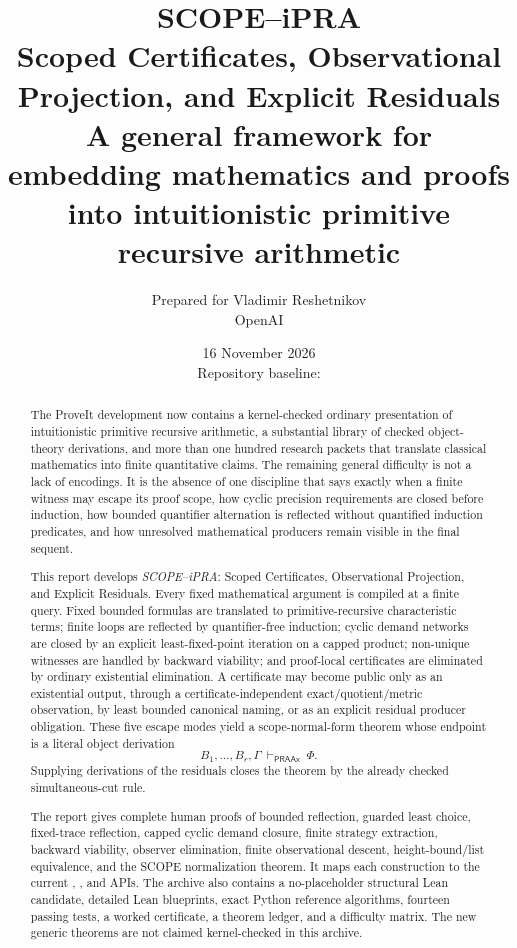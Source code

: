 \documentclass[11pt,oneside]{article}
\title{\textbf{SCOPE--iPRA}\\[2mm]
\Large Scoped Certificates, Observational Projection, and Explicit Residuals\\[2mm]
\large A general framework for embedding mathematics and proofs into intuitionistic primitive recursive arithmetic}
\author{Prepared for Vladimir Reshetnikov\\OpenAI}
\date{16 November 2026\\Repository baseline: \code{58627ed89814ba122e1f0f012f1aba103cda267b}}
\theoremstyle{remark}
\newcommand{\PRAAx}{\mathsf{PRAAx}}
\newcommand{\code}[1]{\texttt{\detokenize{#1}}}
\begin{document}
\maketitle

\begin{abstract}
The ProveIt development now contains a kernel-checked ordinary presentation of intuitionistic primitive recursive arithmetic, a substantial library of checked object-theory derivations, and more than one hundred research packets that translate classical mathematics into finite quantitative claims.  The remaining general difficulty is not a lack of encodings.  It is the absence of one discipline that says exactly when a finite witness may escape its proof scope, how cyclic precision requirements are closed before induction, how bounded quantifier alternation is reflected without quantified induction predicates, and how unresolved mathematical producers remain visible in the final sequent.

This report develops \emph{SCOPE--iPRA}: Scoped Certificates, Observational Projection, and Explicit Residuals.  Every fixed mathematical argument is compiled at a finite query.  Fixed bounded formulas are translated to primitive-recursive characteristic terms; finite loops are reflected by quantifier-free induction; cyclic demand networks are closed by an explicit least-fixed-point iteration on a capped product; non-unique witnesses are handled by backward viability; and proof-local certificates are eliminated by ordinary existential elimination.  A certificate may become public only as an existential output, through a certificate-independent exact/quotient/metric observation, by least bounded canonical naming, or as an explicit residual producer obligation.  These five escape modes yield a scope-normal-form theorem whose endpoint is a literal object derivation
\[
  B_1,\ldots,B_r,\Gamma\ \vdash_{\PRAAx}\ \Phi.
\]
Supplying derivations of the residuals closes the theorem by the already checked simultaneous-cut rule.

The report gives complete human proofs of bounded reflection, guarded least choice, fixed-trace reflection, capped cyclic demand closure, finite strategy extraction, backward viability, observer elimination, finite observational descent, height-bound/list equivalence, and the SCOPE normalization theorem.  It maps each construction to the current \code{ConciseIPRA}, \code{IPRADerivations}, and \code{IPRABridge} APIs.  The archive also contains a no-placeholder structural Lean candidate, detailed Lean blueprints, exact Python reference algorithms, fourteen passing tests, a worked certificate, a theorem ledger, and a difficulty matrix.  The new generic theorems are not claimed kernel-checked in this archive.
\end{abstract}
\end{document}
